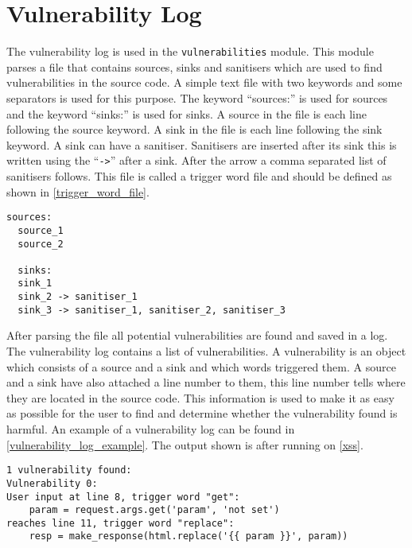 \section{Vulnerability Log}
The vulnerability log is used in the \texttt{vulnerabilities} module.
This module parses a file that contains sources, sinks and sanitisers which are used to find vulnerabilities in the source code.
A simple text file with two keywords and some separators is used for this purpose.
The keyword ``sources:'' is used for sources and the keyword ``sinks:'' is used for sinks.
A source in the file is each line following the source keyword.
A sink in the file is each line following the sink keyword.
A sink can have a sanitiser.
Sanitisers are inserted after its sink this is written using the ``\texttt{->}'' after a sink.
After the arrow a comma separated list of sanitisers follows.
This file is called a trigger word file and should be defined as shown in \cref{trigger_word_file}.
\begin{lstlisting}[style=default, caption={How the trigger word file should be defined.}, label={trigger_word_file}]
  sources:
  source_1
  source_2

  sinks:
  sink_1
  sink_2 -> sanitiser_1
  sink_3 -> sanitiser_1, sanitiser_2, sanitiser_3
\end{lstlisting}

After parsing the file all potential vulnerabilities are found and saved in a log.
The vulnerability log contains a list of vulnerabilities.
A vulnerability is an object which consists of a source and a sink and which words triggered them.
A source and a sink have also attached a line number to them, this line number tells where they are located in the source code.
This information is used to make it as easy as possible for the user to find and determine whether the vulnerability found is harmful.
An example of a vulnerability log can be found in \cref{vulnerability_log_example}.
The output shown is after running \pyt{} on \cref{xss}.

\begin{lstlisting}[style=default, caption={An example of how the vulnerability log looks after it found one vulnerability.}, label={vulnerability_log_example}]
1 vulnerability found:
Vulnerability 0:
User input at line 8, trigger word "get": 
	param = request.args.get('param', 'not set')
reaches line 11, trigger word "replace": 
	resp = make_response(html.replace('{{ param }}', param))
\end{lstlisting}
